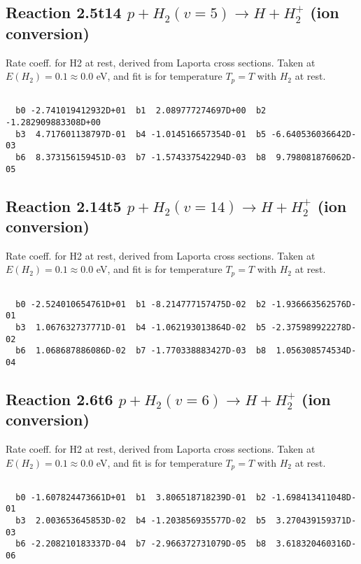 \documentclass[12pt,dvipdfmx]{article}
\begin{document}
\newpage
\subsection{
Reaction 2.5t14
$ p + H_2(v=5) \rightarrow H + H_2^+$ (ion conversion)
}
Rate coeff. for H2 at rest, derived from Laporta cross sections.
Taken at $E(H_2) = 0.1 \approx 0.0$ eV,  and fit is for temperature $T_p=T$ with $H_2$ at rest.

\begin{small}\begin{verbatim}

  b0 -2.741019412932D+01  b1  2.089777274697D+00  b2 -1.282909883308D+00
  b3  4.717601138797D-01  b4 -1.014516657354D-01  b5 -6.640536036642D-03
  b6  8.373156159451D-03  b7 -1.574337542294D-03  b8  9.798081876062D-05

\end{verbatim}\end{small}

\newpage
\subsection{
Reaction 2.14t5
$ p + H_2(v=14) \rightarrow H + H_2^+$ (ion conversion)
}
Rate coeff. for H2 at rest, derived from Laporta cross sections.
Taken at $E(H_2) = 0.1 \approx 0.0$ eV,  and fit is for temperature $T_p=T$ with $H_2$ at rest.

\begin{small}\begin{verbatim}

  b0 -2.524010654761D+01  b1 -8.214777157475D-02  b2 -1.936663562576D-01
  b3  1.067632737771D-01  b4 -1.062193013864D-02  b5 -2.375989922278D-02
  b6  1.068687886086D-02  b7 -1.770338883427D-03  b8  1.056308574534D-04

\end{verbatim}\end{small}

\newpage
\subsection{
Reaction 2.6t6
$ p + H_2(v=6) \rightarrow H + H_2^+$ (ion conversion)
}
Rate coeff. for H2 at rest, derived from Laporta cross sections.
Taken at $E(H_2) = 0.1 \approx 0.0$ eV,  and fit is for temperature $T_p=T$ with $H_2$ at rest.

\begin{small}\begin{verbatim}

  b0 -1.607824473661D+01  b1  3.806518718239D-01  b2 -1.698413411048D-01
  b3  2.003653645853D-02  b4 -1.203856935577D-02  b5  3.270439159371D-03
  b6 -2.208210183337D-04  b7 -2.966372731079D-05  b8  3.618320460316D-06

\end{verbatim}\end{small}
\end{document}
